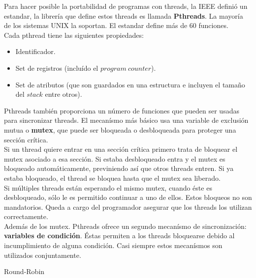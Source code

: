 Para hacer posible la portabilidad de programas con threads, la IEEE definió un estandar, la librería que define estos threads es llamada \textbf{Pthreads}.
La mayoría de los sistemas UNIX la soportan. El estandar define más de 60 funciones.\\
Cada pthread tiene las siguientes propiedades:
\begin{itemize}
 \item Identificador.
 \item Set de registros (incluído el $program\ counter$).
 \item Set de atributos (que son guardados en una estructura e incluyen el tamaño del $stack$ entre otros).\\
\end{itemize}

Pthreads también proporciona un número de funciones que pueden ser usadas para sincronizar threads. El mecanísmo más básico usa una variable
de exclusión mutua o \textbf{mutex}, que puede ser bloqueada o desbloqueada para proteger una sección crítica.\\
Si un thread quiere entrar en una sección crítica primero trata de bloquear el mutex asociado a esa sección. Si estaba desbloqueado entra y 
el mutex es bloqueado automáticamente, previniendo así que otros threads entren. Si ya estaba bloqueado, el thread se bloquea hasta que el
mutex sea liberado.\\ 
Si múltiples threads están esperando el mismo mutex, cuando éste es desbloqueado, sólo le es permitido continuar a uno de ellos.
Estos bloqueos no son mandatorios. Queda a cargo del programador asegurar que los threads los utilizan correctamente.\\

Además de los mutex. Pthreads ofrece un segundo mecanísmo de sincronización: \textbf{variables de condición}. Éstas permiten a los threads 
bloquearse debido al incumplimiento de alguna condición. Casi siempre estos mecanísmos son utilizados conjuntamente.


\begin{algorithm}
  \caption{Round-Robin}
  \begin{algorithmic}[1]
    \EndProcedure
 \end{algorithmic}
\end{algorithm}